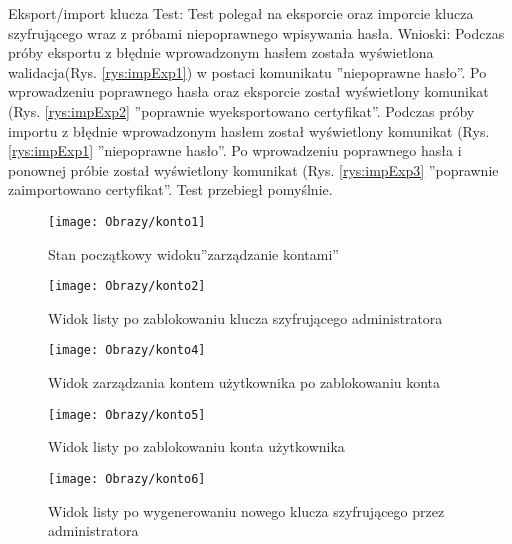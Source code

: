 \documentclass[twoside,10pt]{article}
\begin{document}
\begin{enumerate*}
\item Eksport/import klucza\newline
Test: Test polegał na eksporcie oraz imporcie klucza szyfrującego wraz z próbami niepoprawnego wpisywania hasła.\newline
Wnioski: Podczas próby eksportu z błędnie wprowadzonym hasłem została wyświetlona walidacja(Rys. \ref{rys:impExp1}) w postaci komunikatu ''niepoprawne hasło''. Po wprowadzeniu poprawnego hasła oraz eksporcie został wyświetlony komunikat (Rys. \ref{rys:impExp2} ''poprawnie wyeksportowano certyfikat''. Podczas próby importu z błędnie wprowadzonym hasłem został wyświetlony komunikat (Rys. \ref{rys:impExp1} ''niepoprawne hasło''. Po wprowadzeniu poprawnego hasła i ponownej próbie został wyświetlony komunikat (Rys. \ref{rys:impExp3} ''poprawnie zaimportowano certyfikat''. Test przebiegł pomyślnie.
\begin{figure}[ht!]
\centering
\begin{minipage}{0.23\textwidth}
\texttt{[image: Obrazy/konto1]}
\caption{Stan początkowy widoku''zarządzanie kontami'' }
\label{rys:zarzadzanieKontem1}
\end{minipage}
\hspace{0.01\textwidth}
\begin{minipage}{0.23\textwidth}
\texttt{[image: Obrazy/konto2]}
\caption{Widok listy po zablokowaniu klucza szyfrującego administratora }
\label{rys:zarzadzanieKontem2}
\end{minipage}
\hspace{0.01\textwidth}
\begin{minipage}{0.23\textwidth}
\texttt{[image: Obrazy/konto4]}
\caption{Widok zarządzania kontem użytkownika po zablokowaniu konta }
\label{rys:zarzadzanieKontem4}
\end{minipage}
\hspace{0.01\textwidth}
\begin{minipage}{0.23\textwidth}
\texttt{[image: Obrazy/konto5]}
\caption{Widok listy po zablokowaniu konta użytkownika}
\label{rys:zarzadzanieKontem5}
\end{minipage}
\end{figure}
\newpage
\begin{figure}[ht!]
\centering
\begin{minipage}{0.3\textwidth}
\texttt{[image: Obrazy/konto6]}
\caption{Widok listy po wygenerowaniu nowego klucza szyfrującego przez administratora}
\label{rys:zarzadzanieKontem6}

\end{minipage}
\end{figure}
\end{enumerate*}
\end{document}
